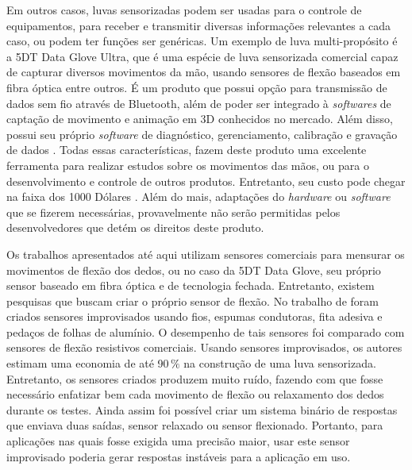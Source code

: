 \documentclass[
	12pt,				%
	openright,			%
	oneside,			%
	a4paper,			%
	english,			%
	brazil				%
	]{abntex2}
\begin{document}
		Em outros casos, luvas sensorizadas podem ser usadas para o controle de equipamentos, para receber e transmitir diversas informações relevantes a cada caso, ou podem ter funções ser genéricas. Um exemplo de luva multi-propósito é a 5DT Data Glove Ultra, que é uma espécie de luva sensorizada comercial capaz de capturar diversos movimentos da mão, usando sensores de flexão baseados em fibra óptica entre outros. É um produto que possui opção para transmissão de dados sem fio através de Bluetooth, além de poder ser integrado à \textit{softwares} de captação de movimento e animação em 3D conhecidos no mercado. Além disso, possui seu próprio \textit{software} de diagnóstico, gerenciamento, calibração e gravação de dados \cite{5DT-ultra}. Todas essas características, fazem deste produto uma excelente ferramenta para realizar estudos sobre os movimentos das mãos, ou para o desenvolvimento e controle de outros produtos. Entretanto, seu custo pode chegar na faixa dos 1000 Dólares \cite{5DT-glove2019ebay}. Além do mais, adaptações do \textit{hardware} ou \textit{software} que se fizerem necessárias, provavelmente não serão permitidas pelos desenvolvedores que detém os direitos deste produto.

		Os trabalhos apresentados até aqui utilizam sensores comerciais para mensurar os movimentos de flexão dos dedos, ou no caso da 5DT Data Glove, seu próprio sensor baseado em fibra óptica e de tecnologia fechada. Entretanto, existem pesquisas que buscam criar o próprio sensor de flexão. No trabalho de \cite{flores2014glovecontroller} foram criados sensores improvisados usando fios, espumas condutoras, fita adesiva e pedaços de folhas de alumínio. O desempenho de tais sensores foi comparado com sensores de flexão resistivos comerciais. Usando sensores improvisados, os autores estimam uma economia de até 90$\,\%$ na construção de uma luva sensorizada. Entretanto, os sensores criados produzem muito ruído, fazendo com que fosse necessário enfatizar bem cada movimento de flexão ou relaxamento dos dedos durante os testes. Ainda assim foi possível criar um sistema binário de respostas que enviava duas saídas, sensor relaxado ou sensor flexionado. Portanto, para aplicações nas quais fosse exigida uma precisão maior, usar este sensor improvisado poderia gerar respostas instáveis para a aplicação em uso.


\end{document}
